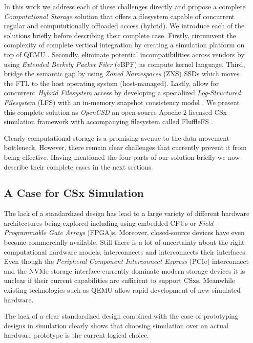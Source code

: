 
In this work we address each of these challenges directly and propose a
complete \textit{Computational Storage} solution that offers a filesystem
capable of concurrent regular and compututionally offloaded access (hybrid).
We introduce each of the solutions briefly before describing their complete
case. Firstly, circumvent the complexity of complete vertical integration by
creating a simulation platform on top of QEMU \cite{qemu}. Secondly, eliminate
potential incompatibilities across vendors by using \textit{Extended Berkely
Packet Filer} (eBPF) \cite{what-ebpf} as compute kernel language. Third, bridge
the semantic gap by using \textit{Zoned Namespaces} (ZNS) \cite{zns} SSDs which
moves the FTL to the host operating system (host-managed). Lastly, allow for
concurrent \textit{Hybrid Filesystem} access by developing a specialized
\textit{Log-Structured Filesystem} (LFS) \cite{Rosenblum1992TheDA} with an
in-memory snapshot consistency model \cite{Viotti2016ConsistencyIN}. We present
this complete solution as \textit{OpenCSD} an open-source Apache 2 licensed CSx
simulation framework with accompanying filesystem called FluffleFS
\cite{qemu-csd}.

Clearly computational storage is a promising avenue to the data movement
bottleneck. However, there remain clear challenges that currently prevent it
from being effective. Having mentioned the four parts of our solution briefly we
now describe their complete cases in the next sections.

\subsection{A Case for CSx Simulation}

The lack of a standardized design has lead to a large variety of different
hardware architectures being explored including using embedded CPUs or
\textit{Field-Programmable Gate Arrays} (FPGA)s. Moreover, closed-source
devices have even become commercially available. Still there is a lot of
uncertainty about the right computational hardware models, interconnects and
interconnects their interfaces. Even though the \textit{Peripheral Component
Interconnect Express} (PCIe) interconnect and the NVMe storage interface
currently dominate modern storage devices it is unclear if their current
capabilities are sufficient to support CSxs. Meanwhile existing technologies
such as QEMU allow rapid development of new simulated hardware.

The lack of a clear standardized design combined with the ease of prototyping
designs in simulation clearly shows that choosing simulation over an actual
hardware prototype is the current logical choice.

